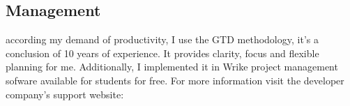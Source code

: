 		\subsection{Management}
according my demand of productivity, I use the GTD\cite{GTD} methodology, it's a conclusion of 10 years of experience. It provides clarity, focus and flexible planning for me. Additionally, I implemented it in Wrike \cite{WRIKE} project management sofware available for students for free. For more information visit the developer company's support website: \cite{WRIKE_for_students}